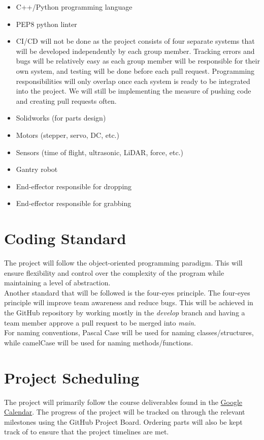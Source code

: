 \documentclass{article}
\begin{document}
	\begin{itemize}
	\item C++/Python programming language
	\item PEP8 python linter
	\item CI/CD will not be done as the project consists of four separate systems that will be developed independently by each group member. Tracking errors and bugs will be relatively 
	easy as each group member will be responsible for their own system, and testing will be done before each pull request. Programming responsibilities will only overlap once each 
	system is ready to be integrated into the project. We will still be implementing the measure of pushing code and creating pull requests often.
	\item Solidworks (for parts design)
	\item Motors (stepper, servo, DC, etc.)
	\item Sensors (time of flight, ultrasonic, LiDAR, force, etc.)
	\item Gantry robot
	\item End-effector responsible for dropping
	\item End-effector responsible for grabbing
	\end{itemize}
	
	\section{Coding Standard}
	The project will follow the object-oriented programming paradigm. This will ensure flexibility 
	and control over the complexity of the program while maintaining a level of abstraction.\\

	\noindent Another standard that will be followed is the four-eyes principle. The four-eyes principle 
	will improve team awareness and reduce bugs. This will be achieved in the GitHub repository by 
	working mostly in the \emph{develop} branch and having a team member approve a pull request to be merged into \emph{main}.\\

	\noindent For naming conventions, Pascal Case will be used for naming classes/structures, while camelCase will be used for naming methods/functions.

	\section{Project Scheduling}
	The project will primarily follow the course deliverables found in the 
	\href{https://calendar.google.com/calendar/embed?src=rnboqiaki1k2la7rpu3bn0um58%40group.calendar.google.com&ctz=America%2FToronto}{Google Calendar}. 
	The progress of the project will be tracked on through the relevant milestones using the GitHub Project Board. 
	Ordering parts will also be kept track of to ensure that the project timelines are met.\\
\end{document}
